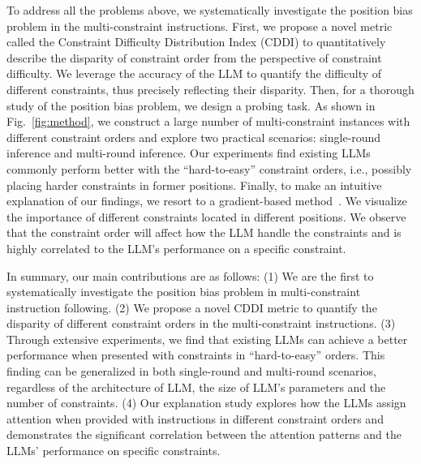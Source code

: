 To address all the problems above, we systematically investigate the position bias problem in the multi-constraint instructions. First, we propose a novel metric called the Constraint Difficulty Distribution Index (CDDI) to quantitatively describe the disparity of constraint order from the perspective of constraint difficulty. We leverage the accuracy of the LLM to quantify the difficulty of different constraints, thus precisely reflecting their disparity. Then, for a thorough study of the position bias problem, we design a probing task. As shown in Fig.~\ref{fig:method}, we construct a large number of multi-constraint instances with different constraint orders and explore two practical scenarios: single-round inference and multi-round inference. Our experiments find existing LLMs commonly perform better with the ``hard-to-easy'' constraint orders, i.e., possibly placing harder constraints in former positions. Finally, to make an intuitive explanation of our findings, we resort to a gradient-based method~\cite{wu2023language}. We visualize the importance of different constraints located in different positions. We observe that the constraint order will affect how the LLM handle the constraints and is highly correlated to the LLM's performance on a specific constraint.

In summary, our main contributions are as follows: (1) We are the first to systematically investigate the position bias problem in multi-constraint instruction following. (2) We propose a novel CDDI metric to quantify the disparity of different constraint orders in the multi-constraint instructions. (3) Through extensive experiments, we find that existing LLMs can achieve a better performance when presented with constraints in ``hard-to-easy'' orders. This finding can be generalized in both single-round and multi-round scenarios, regardless of the architecture of LLM, the size of LLM's parameters and the number of constraints. (4) Our explanation study explores how the LLMs assign attention when provided with instructions in different constraint orders and demonstrates the significant correlation between the attention patterns and the LLMs' performance on specific constraints.




